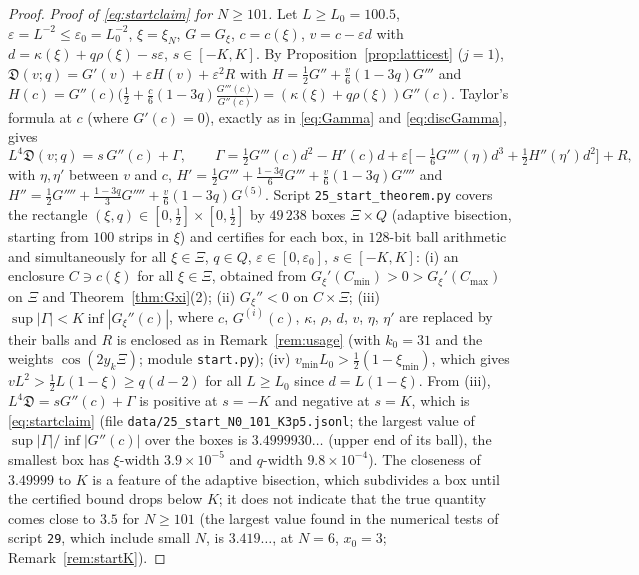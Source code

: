\documentclass[11pt,a4paper]{article}
\theoremstyle{definition}
\theoremstyle{remark}
\newcommand{\fD}{\mathfrak{D}}
\begin{document}
\begin{proof}
\emph{Proof of \eqref{eq:startclaim} for $N\ge101$.} Let $L\ge L_0=100.5$, $\varepsilon=L^{-2}\le\varepsilon_0=L_0^{-2}$,
$\xi=\xi_N$, $G=G_\xi$, $c=c(\xi)$, $v=c-\varepsilon d$ with $d=\kappa(\xi)+q\rho(\xi)-s\varepsilon$, $s\in[-K,K]$. By
Proposition~\ref{prop:latticest} ($j=1$), $\fD(v;q)=G'(v)+\varepsilon H(v)+\varepsilon^2R$ with
$H=\frac12G''+\frac v6(1-3q)G'''$ and $H(c)=G''(c)\bigl(\frac12+\frac c6(1-3q)\frac{G'''(c)}{G''(c)}\bigr)=(\kappa(\xi)+q\rho(\xi))G''(c)$.
Taylor's formula at $c$ (where $G'(c)=0$), exactly as in \eqref{eq:Gamma} and \eqref{eq:discGamma}, gives
\[
   L^4\fD(v;q)=s\,G''(c)+\Gamma,\qquad
   \Gamma=\tfrac12G'''(c)d^2-H'(c)d+\varepsilon\bigl[-\tfrac16G''''(\eta)d^3+\tfrac12H''(\eta')d^2\bigr]+R ,
\]
with $\eta,\eta'$ between $v$ and $c$, $H'=\frac12G'''+\frac{1-3q}6G'''+\frac v6(1-3q)G''''$ and
$H''=\frac12G''''+\frac{1-3q}3G''''+\frac v6(1-3q)G^{(5)}$. Script \texttt{25\_start\_theorem.py} covers the rectangle
$(\xi,q)\in[0,\frac12]\times[0,\frac12]$ by $49\,238$ boxes $\Xi\times Q$ (adaptive bisection, starting from $100$ strips in
$\xi$) and certifies for each box, in $128$-bit ball arithmetic and simultaneously for all $\xi\in\Xi$, $q\in Q$,
$\varepsilon\in[0,\varepsilon_0]$, $s\in[-K,K]$:
(i) an enclosure $C\ni c(\xi)$ for all $\xi\in\Xi$, obtained from $G_\xi'(C_{\min})>0>G_\xi'(C_{\max})$ on $\Xi$ and
Theorem~\ref{thm:Gxi}(2); (ii) $G_\xi''<0$ on $C\times\Xi$; (iii) $\sup|\Gamma|<K\inf|G_\xi''(c)|$, where $c$, $G^{(i)}(c)$,
$\kappa$, $\rho$, $d$, $v$, $\eta$, $\eta'$ are replaced by their balls and $R$ is enclosed as in
Remark~\ref{rem:usage} (with $k_0=31$ and the weights $\cos(2y_k\Xi)$; module \texttt{start.py}); (iv)
$v_{\min}L_0>\frac12(1-\xi_{\min})$, which gives $vL^2>\frac12L(1-\xi)\ge q(d-2)$ for all $L\ge L_0$ since $d=L(1-\xi)$.
From (iii), $L^4\fD=sG''(c)+\Gamma$ is positive at $s=-K$ and negative at $s=K$, which is \eqref{eq:startclaim}
(file \texttt{data/25\_start\_N0\_101\_K3p5.jsonl}; the largest value of $\sup|\Gamma|/\inf|G''(c)|$ over the boxes is
$3.4999930\ldots$ (upper end of its ball), the smallest box has $\xi$-width $3.9\times10^{-5}$ and $q$-width
$9.8\times10^{-4}$). The closeness of $3.49999$ to $K$ is a feature of the adaptive bisection, which subdivides a box
until the certified bound drops below $K$; it does not indicate that the true quantity comes close to $3.5$ for
$N\ge101$ (the largest value found in the numerical tests of script \texttt{29}, which include small $N$, is $3.419\ldots$, at
$N=6$, $x_0=3$; Remark~\ref{rem:startK}).


\end{proof}
\end{document}
